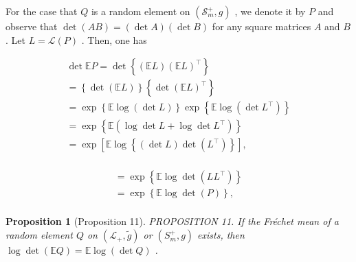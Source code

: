 \documentclass[11pt]{article}
\newtheorem{proposition}{Proposition}
\begin{document}
For the case that  $Q$  is a random element on  $(\mathcal{S}_m^+, g)$ , we denote it by  $P$  and observe that  $\operatorname{det}(AB) = (\operatorname{det} A)(\operatorname{det} B)$  for any square matrices  $A$  and  $B$ . Let  $L = \mathcal{L}(P)$ . Then, one has

$$
\begin{array}{l} \det  \mathbb {E} P = \det  \left\{\left(\mathbb {E} L\right) \left(\mathbb {E} L\right) ^ {\top} \right\} \\ = \left\{\det  (\mathbb {E} L) \right\} \left\{\det  (\mathbb {E} L) ^ {\top} \right\} \\ = \exp \left\{\mathbb {E} \log (\det  L) \right\} \exp \left\{\mathbb {E} \log (\det  L ^ {\top}) \right\} \\ = \exp \left\{\mathbb {E} \left(\log \det  L + \log \det  L ^ {\top}\right) \right\} \\ = \exp \left[ \mathbb {E} \log \left\{\left(\det  L\right) \det  \left(L ^ {\top}\right) \right\} \right], \\ \end{array}
$$

$$
\begin{array}{l} = \exp \left\{\mathbb {E} \log \det  (L L ^ {\top}) \right\} \\ = \exp \left\{\mathbb {E} \log \det  (P) \right\}, \\ \end{array}
$$


\begin{proposition}[Proposition 11]
PROPOSITION 11. If the Fréchet mean of a random element  $Q$  on  $(\mathcal{L}_{+},\tilde{g})$  or  $(S_{m}^{+},g)$  exists, then  $\log \det(\mathbb{E}Q) = \mathbb{E}\log(\det Q)$ .
\end{proposition}
\end{document}

